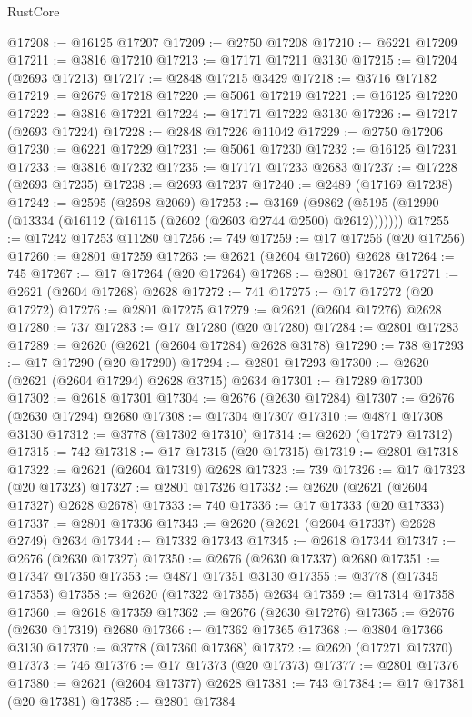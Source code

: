 \begin{lexlean}{RustCore}
\begin{coremodule}
@17208 := @16125 @17207
@17209 := @2750 @17208
@17210 := @6221 @17209
@17211 := @3816 @17210
@17213 := @17171 @17211 @3130
@17215 := @17204 (@2693 @17213)
@17217 := @2848 @17215 @3429
@17218 := @3716 @17182
@17219 := @2679 @17218
@17220 := @5061 @17219
@17221 := @16125 @17220
@17222 := @3816 @17221
@17224 := @17171 @17222 @3130
@17226 := @17217 (@2693 @17224)
@17228 := @2848 @17226 @11042
@17229 := @2750 @17206
@17230 := @6221 @17229
@17231 := @5061 @17230
@17232 := @16125 @17231
@17233 := @3816 @17232
@17235 := @17171 @17233 @2683
@17237 := @17228 (@2693 @17235)
@17238 := @2693 @17237
@17240 := @2489 (@17169 @17238)
@17242 := @2595 (@2598 @2069)
@17253 := @3169
    (@9862 (@5195 (@12990 (@13334 (@16112 (@16115 (@2602 (@2603 @2744 @2500) @2612)))))))
@17255 := @17242 @17253 @11280
@17256 := 749
@17259 := @17 @17256 (@20 @17256)
@17260 := @2801 @17259
@17263 := @2621 (@2604 @17260) @2628
@17264 := 745
@17267 := @17 @17264 (@20 @17264)
@17268 := @2801 @17267
@17271 := @2621 (@2604 @17268) @2628
@17272 := 741
@17275 := @17 @17272 (@20 @17272)
@17276 := @2801 @17275
@17279 := @2621 (@2604 @17276) @2628
@17280 := 737
@17283 := @17 @17280 (@20 @17280)
@17284 := @2801 @17283
@17289 := @2620 (@2621 (@2604 @17284) @2628 @3178)
@17290 := 738
@17293 := @17 @17290 (@20 @17290)
@17294 := @2801 @17293
@17300 := @2620 (@2621 (@2604 @17294) @2628 @3715) @2634
@17301 := @17289 @17300
@17302 := @2618 @17301
@17304 := @2676 (@2630 @17284)
@17307 := @2676 (@2630 @17294) @2680
@17308 := @17304 @17307
@17310 := @4871 @17308 @3130
@17312 := @3778 (@17302 @17310)
@17314 := @2620 (@17279 @17312)
@17315 := 742
@17318 := @17 @17315 (@20 @17315)
@17319 := @2801 @17318
@17322 := @2621 (@2604 @17319) @2628
@17323 := 739
@17326 := @17 @17323 (@20 @17323)
@17327 := @2801 @17326
@17332 := @2620 (@2621 (@2604 @17327) @2628 @2678)
@17333 := 740
@17336 := @17 @17333 (@20 @17333)
@17337 := @2801 @17336
@17343 := @2620 (@2621 (@2604 @17337) @2628 @2749) @2634
@17344 := @17332 @17343
@17345 := @2618 @17344
@17347 := @2676 (@2630 @17327)
@17350 := @2676 (@2630 @17337) @2680
@17351 := @17347 @17350
@17353 := @4871 @17351 @3130
@17355 := @3778 (@17345 @17353)
@17358 := @2620 (@17322 @17355) @2634
@17359 := @17314 @17358
@17360 := @2618 @17359
@17362 := @2676 (@2630 @17276)
@17365 := @2676 (@2630 @17319) @2680
@17366 := @17362 @17365
@17368 := @3804 @17366 @3130
@17370 := @3778 (@17360 @17368)
@17372 := @2620 (@17271 @17370)
@17373 := 746
@17376 := @17 @17373 (@20 @17373)
@17377 := @2801 @17376
@17380 := @2621 (@2604 @17377) @2628
@17381 := 743
@17384 := @17 @17381 (@20 @17381)
@17385 := @2801 @17384

\end{coremodule}
\end{lexlean}
